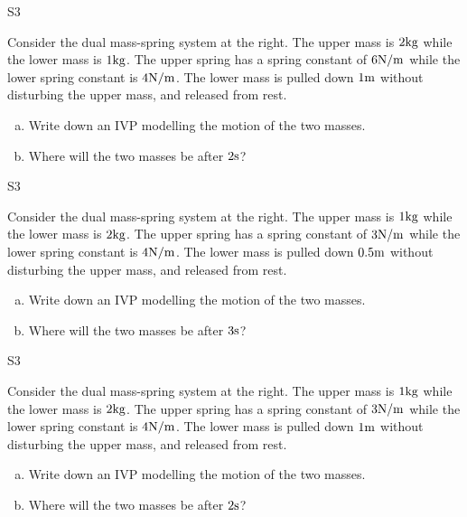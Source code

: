 \begin{problem}{S3}
\begin{minipage}[t]{0.8\linewidth}
Consider the dual mass-spring system at the right.  The upper mass is \(2 {\rm kg}\) while the lower mass is \(1 {\rm kg}\).  The upper spring has a spring constant of \( 6 {\rm N/m}\) while the lower spring constant is \(4 {\rm N/m}\).  The lower mass is pulled down \(1 {\rm m}\) without disturbing the upper mass, and released from rest. 
\begin{enumerate}[(a)]
\item Write down an IVP modelling the motion of the two masses.
\item Where will the two masses be after \(2 {\rm s}\)?
\end{enumerate}
\end{minipage}
\hfill
\springdoublemassQuiz[0.7]
\hfill
\end{problem}

\begin{problem}{S3}
\begin{minipage}[t]{0.8\linewidth}
Consider the dual mass-spring system at the right.  The upper mass is \(1 {\rm kg}\) while the lower mass is \(2 {\rm kg}\).  The upper spring has a spring constant of \( 3 {\rm N/m}\) while the lower spring constant is \(4 {\rm N/m}\).  The lower mass is pulled down \(0.5 {\rm m}\) without disturbing the upper mass, and released from rest. 
\begin{enumerate}[(a)]
\item Write down an IVP modelling the motion of the two masses.
\item Where will the two masses be after \(3 {\rm s}\)?
\end{enumerate}
\end{minipage}
\hfill
\springdoublemassQuiz[0.7]
\hfill
\end{problem}

\begin{problem}{S3}
\begin{minipage}[t]{0.8\linewidth}
Consider the dual mass-spring system at the right.  The upper mass is \(1 {\rm kg}\) while the lower mass is \(2 {\rm kg}\).  The upper spring has a spring constant of \( 3 {\rm N/m}\) while the lower spring constant is \(4 {\rm N/m}\).  The lower mass is pulled down \(1 {\rm m}\) without disturbing the upper mass, and released from rest. 
\begin{enumerate}[(a)]
\item Write down an IVP modelling the motion of the two masses.
\item Where will the two masses be after \(2 {\rm s}\)?
\end{enumerate}
\end{minipage}
\hfill
\springdoublemassQuiz[0.7]
\hfill
\end{problem}
